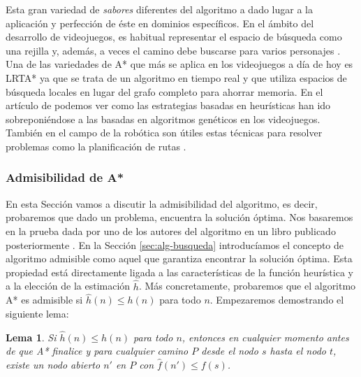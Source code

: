 \documentclass[a4paper,12pt]{article}
\newtheorem{lem}{Lema}
\begin{document}
Esta gran variedad de \textit{sabores} diferentes del algoritmo a dado lugar a la aplicación y perfección de éste en dominios específicos. En el ámbito del desarrollo de videojuegos, es habitual representar el espacio de búsqueda como una rejilla \cite{goos_grid-based_2002, harabor_online_2011, standley_complete_2011, barnouti_pathfinding_2016} y, además, a veces el camino debe buscarse para varios personajes \cite{felner_adding_2018}. Una de las variedades de A* que más se aplica en los videojuegos a día de hoy es LRTA* \cite{bulitko2006learning} ya que se trata de un algoritmo en tiempo real y que utiliza espacios de búsqueda locales en lugar del grafo completo para ahorrar memoria. En el artículo de \cite{rafiq_pathfinding_2020} podemos ver como las estrategias basadas en heurísticas han ido sobreponiéndose a las basadas en algoritmos genéticos en los videojuegos. También en el campo de la robótica son útiles estas técnicas para resolver problemas como la planificación de rutas \cite{martins_improved_2022}.

\subsubsection{Admisibilidad de A*}\label{sec:admisibilidad}

En esta Sección vamos a discutir la admisibilidad del algoritmo, es decir, probaremos que dado un problema, encuentra la solución óptima. Nos basaremos en la prueba dada por uno de los autores del algoritmo en un libro publicado posteriormente \cite[p. 59]{nillsson1971problem}. En la Sección \ref{sec:alg-busqueda} introducíamos el concepto de algoritmo admisible como aquel que garantiza encontrar la solución óptima. Esta propiedad está directamente ligada a las características de la función heurística y a la elección de la estimación $\hat{h}$. Más concretamente, probaremos que el algoritmo A* es admisible si $\hat{h}(n) \leq h(n)$ para todo $n$. Empezaremos demostrando el siguiente lema:

\begin{lem}\label{lem}
Si $\hat{h}(n) \leq h(n)$ para todo $n$, entonces en cualquier momento antes de que A* finalice y para cualquier camino $P$ desde el nodo $s$ hasta el nodo $t$, existe un nodo abierto $n'$ en $P$ con $\hat{f}(n') \leq f(s)$.

\end{lem}
\end{document}
